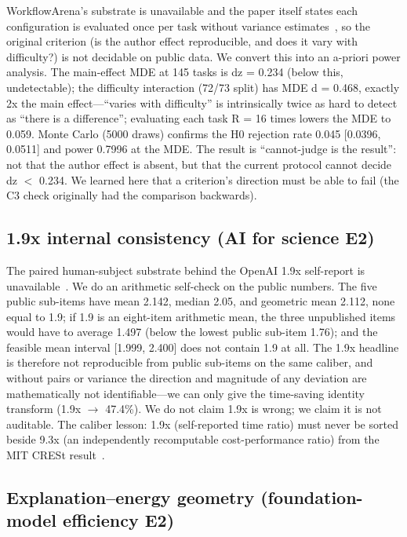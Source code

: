 WorkflowArena's substrate is unavailable and the paper itself states each
configuration is evaluated once per task without variance
estimates~\cite{workflowarena2026}, so the original criterion (is the author
effect reproducible, and does it vary with difficulty?) is not decidable on
public data. We convert this into an a-priori power analysis. The main-effect MDE
at 145 tasks is dz = 0.234 (below this, undetectable); the difficulty interaction
(72/73 split) has MDE d = 0.468, exactly 2x the main effect---``varies with
difficulty'' is intrinsically twice as hard to detect as ``there is a
difference''; evaluating each task R = 16 times lowers the MDE to 0.059. Monte
Carlo (5000 draws) confirms the H0 rejection rate 0.045 [0.0396, 0.0511] and
power 0.7996 at the MDE. The result is ``cannot-judge is the result'': not that
the author effect is absent, but that the current protocol cannot decide dz $<$
0.234. We learned here that a criterion's direction must be able to fail (the
C3 check originally had the comparison backwards).

\subsection{1.9x internal consistency (AI for science E2)}

The paired human-subject substrate behind the OpenAI 1.9x self-report is
unavailable~\cite{openai-science}. We do an arithmetic self-check on the public
numbers. The five public sub-items have mean 2.142, median 2.05, and geometric
mean 2.112, none equal to 1.9; if 1.9 is an eight-item arithmetic mean, the three
unpublished items would have to average 1.497 (below the lowest public sub-item
1.76); and the feasible mean interval [1.999, 2.400] does not contain 1.9 at all.
The 1.9x headline is therefore not reproducible from public sub-items on the
same caliber, and without pairs or variance the direction and magnitude of any
deviation are mathematically not identifiable---we can only give the time-saving
identity transform (1.9x $\rightarrow$ 47.4\%). We do not claim 1.9x is wrong; we
claim it is not auditable. The caliber lesson: 1.9x (self-reported time ratio)
must never be sorted beside 9.3x (an independently recomputable cost-performance
ratio) from the MIT CRESt result~\cite{crest}.

\subsection{Explanation--energy geometry (foundation-model efficiency E2)}

